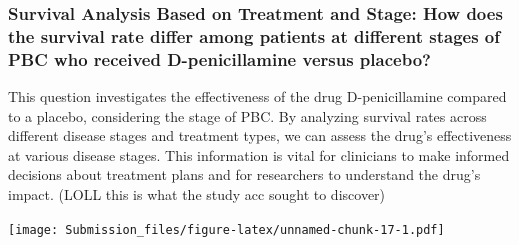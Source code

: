 \documentclass[
]{article}
\newenvironment{Shaded}{\begin{snugshade}}{\end{snugshade}}
\newcommand{\AttributeTok}[1]{\textcolor[rgb]{0.13,0.29,0.53}{#1}}
\newcommand{\CommentTok}[1]{\textcolor[rgb]{0.56,0.35,0.01}{\textit{#1}}}
\newcommand{\ConstantTok}[1]{\textcolor[rgb]{0.56,0.35,0.01}{#1}}
\newcommand{\FunctionTok}[1]{\textcolor[rgb]{0.13,0.29,0.53}{\textbf{#1}}}
\newcommand{\NormalTok}[1]{#1}
\newcommand{\OtherTok}[1]{\textcolor[rgb]{0.56,0.35,0.01}{#1}}
\newcommand{\SpecialCharTok}[1]{\textcolor[rgb]{0.81,0.36,0.00}{\textbf{#1}}}
\newcommand{\StringTok}[1]{\textcolor[rgb]{0.31,0.60,0.02}{#1}}
\begin{document}
\hypertarget{survival-analysis-based-on-treatment-and-stage-how-does-the-survival-rate-differ-among-patients-at-different-stages-of-pbc-who-received-d-penicillamine-versus-placebo}{%
\subsubsection{Survival Analysis Based on Treatment and Stage: How does
the survival rate differ among patients at different stages of PBC who
received D-penicillamine versus
placebo?}\label{survival-analysis-based-on-treatment-and-stage-how-does-the-survival-rate-differ-among-patients-at-different-stages-of-pbc-who-received-d-penicillamine-versus-placebo}}

This question investigates the effectiveness of the drug D-penicillamine
compared to a placebo, considering the stage of PBC. By analyzing
survival rates across different disease stages and treatment types, we
can assess the drug's effectiveness at various disease stages. This
information is vital for clinicians to make informed decisions about
treatment plans and for researchers to understand the drug's impact.
(LOLL this is what the study acc sought to discover)

\begin{Shaded}
\end{Shaded}

\texttt{[image: Submission\_files/figure-latex/unnamed-chunk-17-1.pdf]}
\end{document}
